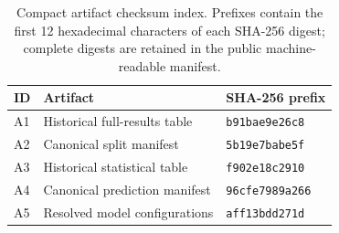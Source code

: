 \begin{table}[htbp]
\centering
\caption{Compact artifact checksum index. Prefixes contain the first 12
hexadecimal characters of each SHA-256 digest; complete digests are retained
in the public machine-readable manifest.}
\label{tab:supp-artifact-hashes}
\small
\begin{tabular}{@{}lll@{}}
\toprule
ID & Artifact & SHA-256 prefix \\
\midrule
A1 & Historical full-results table & \texttt{b91bae9e26c8} \\
A2 & Canonical split manifest & \texttt{5b19e7babe5f} \\
A3 & Historical statistical table & \texttt{f902e18c2910} \\
A4 & Canonical prediction manifest & \texttt{96cfe7989a266} \\
A5 & Resolved model configurations & \texttt{aff13bdd271d} \\
\bottomrule
\end{tabular}
\end{table}
